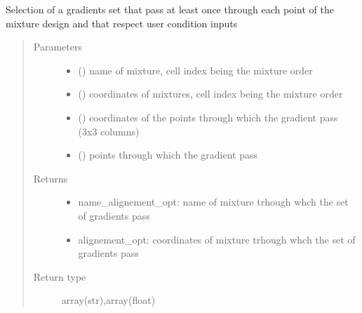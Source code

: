 \documentclass[letterpaper,10pt,english]{sphinxmanual}
\begin{document}
\begin{fulllineitems}
\label{\detokenize{ExperimentsPlannification:modules.gradients_set}}
\sphinxAtStartPar
Selection of a gradients set that pass at least once through each point of the mixture design and that respect user condition inputs
\begin{quote}\begin{description}
\item[{Parameters}] \leavevmode\begin{itemize}
\item {} 
\sphinxAtStartPar
{} () \textendash{} name of mixture, cell index being the mixture order

\item {} 
\sphinxAtStartPar
{} () \textendash{} coordinates of mixtures, cell index being the mixture order 

\item {} 
\sphinxAtStartPar
{} () \textendash{} coordinates of the points through which the gradient pass (3x3 columns)

\item {} 
\sphinxAtStartPar
{} () \textendash{} points through which the gradient pass

\end{itemize}

\item[{Returns}] \leavevmode
\sphinxAtStartPar
\begin{itemize}
\item {} 
\sphinxAtStartPar
name\_alignement\_opt: name of mixture trhough whch the set of gradients pass

\item {} 
\sphinxAtStartPar
alignement\_opt: coordinates of mixture trhough whch the set of gradients pass

\end{itemize}


\item[{Return type}] \leavevmode
\sphinxAtStartPar
array(str),array(float)

\end{description}\end{quote}

\end{fulllineitems}
\end{document}

